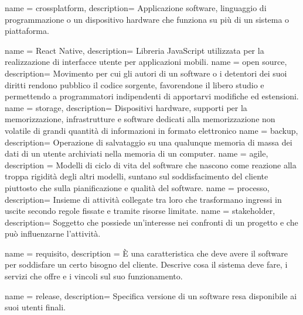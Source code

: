 
 {
  name = crossplatform,
  description={
		Applicazione software, linguaggio di programmazione o un dispositivo hardware che funziona su più di un sistema o piattaforma.
	}
}

 {
  name = React Native,
  description={
		Libreria JavaScript utilizzata per la realizzazione di interfacce utente per applicazioni mobili.
	}
}
 {
  name = open source,
  description={
		Movimento per cui gli autori di un software o i detentori dei suoi diritti rendono pubblico il codice sorgente, favorendone il libero studio e permettendo a programmatori indipendenti di apportarvi modifiche ed estensioni.
	}
}
 {
  name = storage,
  description={
		Dispositivi hardware, supporti per la memorizzazione, infrastrutture e software dedicati alla memorizzazione non volatile di grandi quantità di informazioni in formato elettronico
	}
}
 {
  name = backup,
  description={
		Operazione di salvataggio su una qualunque memoria di massa dei dati di un utente archiviati nella memoria di un computer.
	}
}
 {
  name = agile,
  description = {
		Modelli di ciclo di vita del software che nascono come reazione alla troppa rigidità degli altri modelli, suntano sul soddisfacimento del cliente piuttosto che sulla pianificazione e qualità del software. 
	}
}
 {
  name = processo,
  description={
		Insieme di attività collegate tra loro che trasformano ingressi in uscite secondo regole fissate e tramite risorse limitate.
	}
}
 {
  name = stakeholder,
  description={
  		Soggetto che possiede un'interesse nei confronti di un progetto e che può influenzarne l'attività.
	}
}

 {
  name = requisito,
  description = {
		È una caratteristica che deve avere il software per soddisfare un certo bisogno del cliente. Descrive cosa il sistema deve fare, i servizi che offre e i vincoli sul suo funzionamento.
	}
}

 {
  name = release,
  description={
		Specifica versione di un software resa disponibile ai suoi utenti finali.
	}
}


